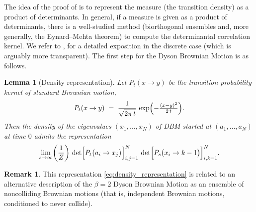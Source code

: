 \documentclass[letterpaper,11pt,oneside,reqno]{article}
\numberwithin{equation}{section}
\newtheorem{lemma}[proposition]{Lemma}
\theoremstyle{definition}
\newtheorem{remark}[proposition]{Remark}
\begin{document}
The idea of the proof of  is to
represent the measure (the transition density) as a
product of determinants. In general,
if a measure is given as a product of determinants,
there is a well-studied method (biorthogonal ensembles and,
more generally, the Eynard--Mehta theorem)
to compute the determinantal correlation kernel.
We refer to
\cite{borodin2005eynard},
\cite{Borodin2009} for a detailed exposition
in the discrete case (which is arguably more transparent).
The first step for the Dyson Brownian Motion is as follows.

\begin{lemma}[Density representation]
\label{lem:density_representation}
Let $P_t(x\to y)$ be the transition probability kernel of standard Brownian motion,
\[
   P_t(x\to y) \;=\; \frac{1}{\sqrt{2\pi\,t}}\,
   \exp\Bigl(-\tfrac{(x-y)^2}{2\,t}\Bigr).
\]
Then the density of the eigenvalues $(x_1,\dots,x_N)$
of DBM started at $(a_1,\dots,a_N)$ at time $0$
admits the representation
\begin{equation}
	\label{eq:density_representation}
   \lim_{s\to\infty}
   \biggl(\frac1Z\biggr)\,
   \det\Bigl[P_t\bigl(a_i\to x_j\bigr)\Bigr]_{i,j=1}^N
   \,\det\Bigl[P_s\bigl(x_i\to k-1\bigr)\Bigr]_{i,k=1}^N.
 \end{equation}
\end{lemma}
\begin{remark}
	This representation
	\eqref{eq:density_representation}
	is related to an alternative description of the
	$\beta=2$ Dyson Brownian Motion as
	an ensemble of noncolliding Brownian motions
	(that is, independent Brownian motions, conditioned to never collide).
\end{remark}
\end{document}
